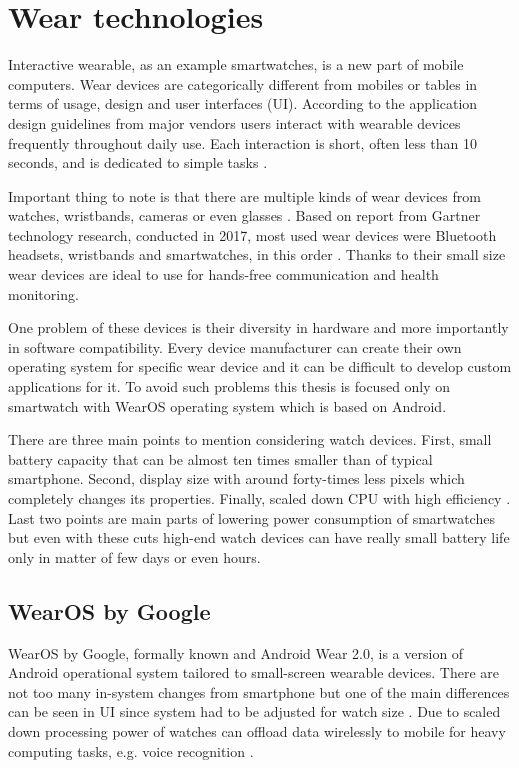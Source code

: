 \section{Wear technologies}\label{sec:WearTechnologies}
Interactive wearable, as an example smartwatches, is a new part of mobile computers. Wear devices are categorically different from mobiles or tables in terms of usage, design and user interfaces (UI). According to the application design guidelines from major vendors users interact with wearable devices frequently throughout daily use. Each interaction is short, often less than 10 seconds, and is dedicated to simple tasks \cite{UtCoAWO}. 

Important thing to note is that there are multiple kinds of wear devices from watches, wristbands, cameras or even glasses \cite{MIWD}. Based on report from Gartner technology research, conducted in 2017, most used wear devices were Bluetooth headsets, wristbands and smartwatches, in this order \cite{GSWWDS}. Thanks to their small size wear devices are ideal to use for hands-free communication and health monitoring.

One problem of these devices is their diversity in hardware and more importantly in software compatibility. Every device manufacturer can create their own operating system for specific wear device and it can be difficult to develop custom applications for it. To avoid such problems this thesis is focused only on smartwatch with WearOS operating system which is based on Android. 

There are three main points to mention considering watch devices. First, small battery capacity that can be almost ten times smaller than of typical smartphone. Second, display size with around forty-times less pixels which completely changes its properties. Finally, scaled down CPU with high efficiency \cite{UtCoAWO}. Last two points are main parts of lowering power consumption of smartwatches but even with these cuts high-end watch devices can have really small battery life only in matter of few days or even hours.

\subsection{WearOS by Google}\label{sec:WearOS}
WearOS by Google, formally known and Android Wear 2.0, is a version of Android operational system tailored to small-screen wearable devices. There are not too many in-system changes from smartphone but one of the main differences can be seen in UI since system had to be adjusted for watch size \cite{CSUITW}. Due to scaled down processing power of watches can offload data wirelessly to mobile for heavy computing tasks, e.g. voice recognition \cite{UCAW}.

